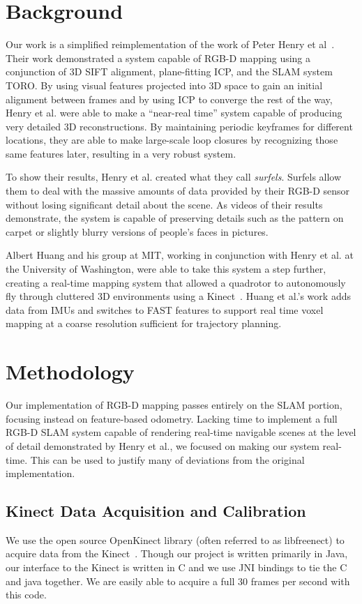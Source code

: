 \documentclass[letterpaper, 10pt, conference]{ieeeconf}
\begin{document}
\section{Background}
Our work is a simplified reimplementation of the work of Peter Henry et
al~\cite{Henry2010rgbd}. Their work demonstrated a system capable of RGB-D
mapping using a conjunction of 3D SIFT alignment, plane-fitting ICP, and the
SLAM system TORO. By using visual features projected into 3D space to gain an
initial alignment between frames and by using ICP to converge the rest of the
way, Henry et al. were able to make a ``near-real time'' system capable of
producing very detailed 3D reconstructions. By maintaining periodic keyframes
for different locations, they are able to make large-scale loop closures by
recognizing those same features later, resulting in a very robust system.

To show their results, Henry et al. created what they call \emph{surfels}.
Surfels allow them to deal with the massive amounts of data provided by their
RGB-D sensor without losing significant detail about the scene. As videos of
their results demonstrate, the system is capable of preserving details such as
the pattern on carpet or slightly blurry versions of people's faces in
pictures.

Albert Huang and his group at MIT, working in conjunction with Henry et al. at
the University of Washington, were able to take this system a step further,
creating a real-time mapping system that allowed a quadrotor to autonomously
fly through cluttered 3D environments using a Kinect~\cite{Huang2011isrr}.
Huang et al.'s work adds data from IMUs and switches to FAST features to
support real time voxel mapping at a coarse resolution sufficient for
trajectory planning.

\section{Methodology}
Our implementation of RGB-D mapping passes entirely on the SLAM portion,
focusing instead on feature-based odometry. Lacking time to implement a
full RGB-D SLAM system capable of rendering real-time navigable scenes at the
level of detail demonstrated by Henry et al., we focused on making our system
real-time. This can be used to justify many of deviations from the original
implementation.

\subsection{Kinect Data Acquisition and Calibration}
We use the open source OpenKinect library (often referred to as libfreenect)
to acquire data from the Kinect~\cite{OpenKinect}. Though our project is
written primarily in Java, our interface to the Kinect is written in C and we
use JNI bindings to tie the C and java together. We are easily able to acquire
a full 30 frames per second with this code.
\end{document}

